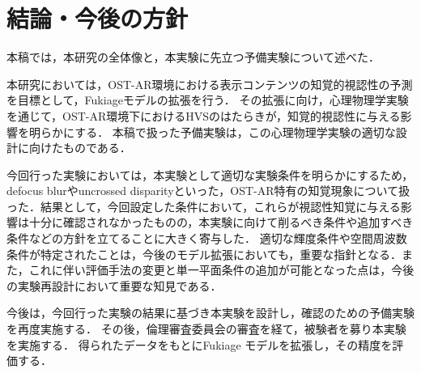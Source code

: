 \documentclass[a4j,10pt,fleqn]{rinkoj}
\begin{document}
\section{結論・今後の方針}
本稿では，本研究の全体像と，本実験に先立つ予備実験について述べた．

本研究においては，OST-AR環境における表示コンテンツの知覚的視認性の予測を目標として，Fukiageモデルの拡張を行う．
その拡張に向け，心理物理学実験を通じて，OST-AR環境下におけるHVSのはたらきが，知覚的視認性に与える影響を明らかにする．
本稿で扱った予備実験は，この心理物理学実験の適切な設計に向けたものである．

今回行った実験においては，本実験として適切な実験条件を明らかにするため，defocus blurやuncrossed disparityといった，OST-AR特有の知覚現象について扱った．結果として，今回設定した条件において，これらが視認性知覚に与える影響は十分に確認されなかったものの，本実験に向けて削るべき条件や追加すべき条件などの方針を立てることに大きく寄与した．
適切な輝度条件や空間周波数条件が特定されたことは，今後のモデル拡張においても，重要な指針となる．また，これに伴い評価手法の変更と単一平面条件の追加が可能となった点は，今後の実験再設計において重要な知見である．

今後は，今回行った実験の結果に基づき本実験を設計し，確認のための予備実験を再度実施する．
その後，倫理審査委員会の審査を経て，被験者を募り本実験を実施する．
得られたデータをもとにFukiage モデルを拡張し，その精度を評価する．

{\small

	
}
\end{document}
